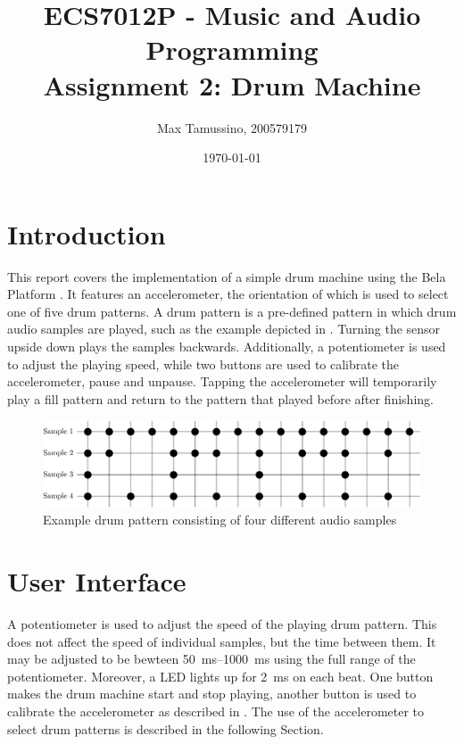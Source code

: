 \documentclass[a4paper, 12pt]{article}
\title{ECS7012P - Music and Audio Programming\\
	   Assignment 2: Drum Machine}
\author{
  Max Tamussino, 200579179
}
\date{\today}
\begin{document}
\maketitle
\tableofcontents
\pagebreak

\section{Introduction} \label{sec:intro}
This report covers the implementation of a simple drum machine using the Bela Platform \cite{McPherson2015}. It features an accelerometer, the orientation of which is used to select one of five drum patterns. A drum pattern is a pre-defined pattern in which drum audio samples are played, such as the example depicted in . Turning the sensor upside down plays the samples backwards. Additionally, a potentiometer is used to adjust the playing speed, while two buttons are used to calibrate the accelerometer, pause and unpause. Tapping the accelerometer will temporarily play a fill pattern and return to the pattern that played before after finishing.

\begin{figure}[h!]
	\centering
	\includegraphics[width=\textwidth]{patterns.png}
	\caption{Example drum pattern consisting of four different audio samples}
	\label{fig:drum-patterns}
\end{figure}

\section{User Interface}
A potentiometer is used to adjust the speed of the playing drum pattern. This does not affect the speed of individual samples, but the time between them. It may be adjusted to be bewteen \SIrange{50}{1000}{\milli\second} using the full range of the potentiometer. Moreover, a LED lights up for \SI{2}{\milli\second} on each beat. One button makes the drum machine start and stop playing, another button is used to calibrate the accelerometer as described in . The use of the accelerometer to select drum patterns is described in the following Section.
\end{document}
